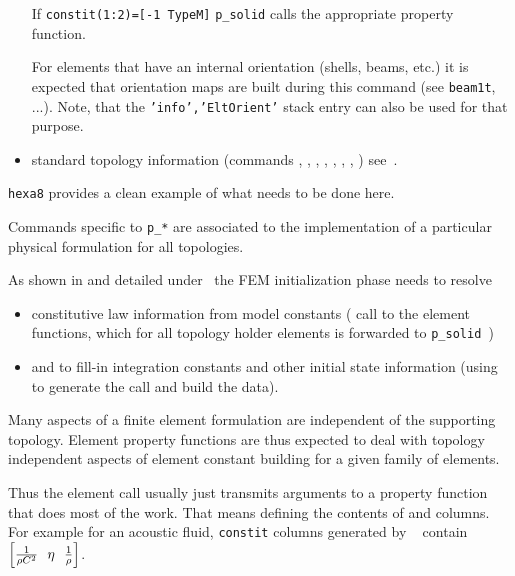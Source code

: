 \begin{itemize}
If {\tt constit(1:2)=[-1 TypeM]} {\tt p\_solid} calls the appropriate property function.

For elements that have an internal orientation (shells, beams, etc.) it is expected that orientation maps are built during this command (see {\tt beam1t}, ...). Note, that the {\tt 'info','EltOrient'} stack entry can also be used for that purpose.

\item standard topology information (commands , , , , , , , ) see~.
\end{itemize}

{\tt hexa8} provides a clean example of what needs to be done here.




Commands specific to {\tt p\_*} are associated to the implementation of a particular physical formulation for all topologies.


As shown in  and detailed under \femknl\ the FEM initialization phase needs to resolve

\begin{itemize}
\item constitutive law information from model constants ( call to the element functions, which for all topology holder elements is forwarded to {\tt p\_solid })
\item and to fill-in integration constants and other initial state information (using  to generate the call and  build the data). 
\end{itemize}

Many aspects of a finite element formulation are independent of the supporting topology. Element property functions are thus expected to deal with topology independent aspects of element constant building for a given family of elements. 

Thus the element  call usually just transmits arguments to a property function that does most of the work. That means defining the contents of  and  columns. For example for an acoustic fluid, {\tt constit} columns generated by \psolid\  contain $\ma{\frac{1}{\rho C^2}\ \ \eta \ \ \frac{1}{\rho}}$. 

